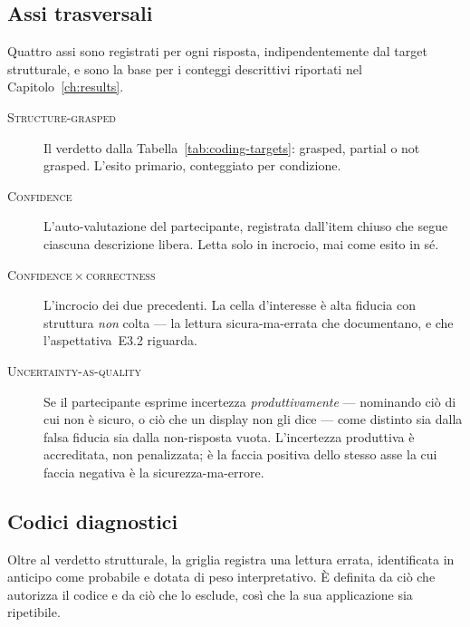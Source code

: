 \subsection{Assi trasversali}
\label{subsec:app-axes}

Quattro assi sono registrati per ogni risposta, indipendentemente dal target strutturale, e sono la base per i conteggi descrittivi riportati nel Capitolo~\ref{ch:results}.

\begin{description}
\item[\textnormal{\textsc{Structure-grasped}}] Il verdetto dalla Tabella~\ref{tab:coding-targets}: grasped, partial o not grasped. L'esito primario, conteggiato per condizione.

\item[\textnormal{\textsc{Confidence}}] L'auto-valutazione del partecipante, registrata dall'item chiuso che segue ciascuna descrizione libera. Letta solo in incrocio, mai come esito in sé.

\item[\textnormal{\textsc{Confidence\,$\times$\,correctness}}] L'incrocio dei due precedenti. La cella d'interesse è alta fiducia con struttura \emph{non} colta --- la lettura sicura-ma-errata che \textcite{fischer2020} documentano, e che l'aspettativa~E3.2 riguarda.

\item[\textnormal{\textsc{Uncertainty-as-quality}}] Se il partecipante esprime incertezza \emph{produttivamente} --- nominando ciò di cui non è sicuro, o ciò che un display non gli dice --- come distinto sia dalla falsa fiducia sia dalla non-risposta vuota. L'incertezza produttiva è accreditata, non penalizzata; è la faccia positiva dello stesso asse la cui faccia negativa è la sicurezza-ma-errore.
\end{description}

\subsection{Codici diagnostici}
\label{subsec:app-diagnostic}

Oltre al verdetto strutturale, la griglia registra una lettura errata, identificata in anticipo come probabile e dotata di peso interpretativo. È definita da ciò che autorizza il codice e da ciò che lo esclude, così che la sua applicazione sia ripetibile.

